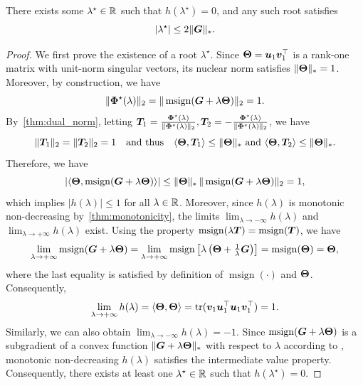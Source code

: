 \begin{theorem}\label{thm:localization}
    There exists some $\lambda^\star\in{\mathbb{R}}$ such that $h(\lambda^\star)=0$, and any such root satisfies
\[
|\lambda^\star|\leq 2\|{\bm{G}}\|_*.
\]
\end{theorem}

\begin{proof}
    We first prove the existence of a root $\lambda^\star$. Since ${\bm{\Theta}}={\bm{u}}_1 {\bm{v}}_1^\top$ is a rank-one matrix with unit-norm singular vectors, its nuclear norm satisfies $\|{\bm{\Theta}}\|_* = 1$. Moreover, by construction, we have
\begin{equation}
\|{\bm{\Phi}}^{\star}(\lambda)\|_2=\|\operatorname{msign}({\bm{G}} + \lambda{\bm{\Theta}})\|_2 = 1.
\end{equation}
By~\cref{thm:dual_norm}, letting ${\bm{T}}_1=\frac{{\bm{\Phi}}^{\star}(\lambda)}{\|{\bm{\Phi}}^{\star}(\lambda)\|_2},{\bm{T}}_2=-\frac{{\bm{\Phi}}^{\star}(\lambda)}{\|{\bm{\Phi}}^{\star}(\lambda)\|_2}$, we have
\begin{equation}\label{eq:abs_bound}
\|\mT_1\|_2=\|\mT_2\|_2=1\quad\text{and thus}\quad\langle\mTheta,\mT_1\rangle\leq\|\mTheta\|_*\ \text{and}\ \langle\mTheta,\mT_2\rangle\leq\|\mTheta\|_*.
\end{equation}
Therefore, we have
\begin{equation}
\left|\langle {\bm{\Theta}},\operatorname{msign}({\bm{G}}+\lambda{\bm{\Theta}})\rangle\right|
\leq
\|{\bm{\Theta}}\|_*\,\|\operatorname{msign}({\bm{G}}+\lambda{\bm{\Theta}})\|_2
=1,
\end{equation}
which implies $|h(\lambda)|\leq 1$ for all $\lambda \in {\mathbb{R}}$. Moreover, since $h(\lambda)$ is monotonic non-decreasing by~\cref{thm:monotonicity}, the limits $\lim_{\lambda\to -\infty} h(\lambda)$ and $\lim_{\lambda\to +\infty} h(\lambda)$ exist. Using the property $\operatorname{msign}(\lambda {\bm{T}})=\operatorname{msign}({\bm{T}})$, we have
\begin{equation}
\lim_{\lambda\to+\infty}\operatorname{msign}({\bm{G}} + \lambda{\bm{\Theta}})
=
\lim_{\lambda\to+\infty}\operatorname{msign}\left[\lambda\left({\bm{\Theta}} + \tfrac{1}{\lambda}{\bm{G}}\right)\right]
=\operatorname{msign}({\bm{\Theta}})
= {\bm{\Theta}},
\end{equation}
where the last equality is satisfied by definition of $\operatorname{msign}(\cdot)$ and ${\bm{\Theta}}$. Consequently,
\begin{equation}
\lim_{\lambda\to +\infty} h(\lambda)
=
\langle {\bm{\Theta}},{\bm{\Theta}}\rangle
=
\operatorname{tr}({\bm{v}}_1 {\bm{u}}_1^\top {\bm{u}}_1 {\bm{v}}_1^\top)
=
1.
\end{equation}
Similarly, we can also obtain $\lim_{\lambda\to -\infty} h(\lambda) = -1$. Since $\operatorname{msign}({\bm{G}}+\lambda{\bm{\Theta}})$ is a subgradient of a convex function $\|{\bm{G}}+\lambda{\bm{\Theta}}\|_*$ with respect to $\lambda$ according to \citet{watson1992characterization}, monotonic non-decreasing $h(\lambda)$ satisfies the intermediate value property. Consequently, there exists at least one
$\lambda^\star \in {\mathbb{R}}$ such that $h(\lambda^\star) = 0$.


\end{proof}
